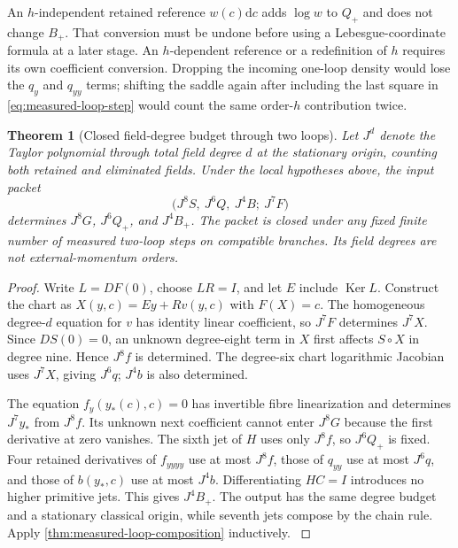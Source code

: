\documentclass[11pt,oneside,openany]{book}
\newtheorem{theorem}{Theorem}[chapter]
\theoremstyle{definition}
\theoremstyle{remark}
\newcommand{\dd}{\mathrm d}
\newcommand{\Ker}{\operatorname{Ker}}
\newcommand{\src}[2]{\cite[#2]{#1}}
\begin{document}
An $h$-independent retained reference $w(c)\dd c$ adds $\log w$ to
$Q_+$ and does not change $B_+$. That conversion must be undone before
using a Lebesgue-coordinate formula at a later stage. An $h$-dependent
reference or a redefinition of $h$ requires its own coefficient
conversion. Dropping the incoming one-loop density would lose the
$q_y$ and $q_{yy}$ terms; shifting the saddle again after including
the last square in \cref{eq:measured-loop-step} would count the same
order-$h$ contribution twice.

\begin{theorem}[Closed field-degree budget through two loops]
\label{thm:closed-loop-jet-packet}
Let $J^d$ denote the Taylor polynomial through total field degree $d$
at the stationary origin, counting both retained and eliminated
fields. Under the local hypotheses above, the input packet
\begin{equation}
 \bigl(J^8S,\ J^6Q,\ J^4B;\ J^7F\bigr)
 \label{eq:closed-loop-jet-packet}
\end{equation}
determines $J^8G$, $J^6Q_+$, and $J^4B_+$. The packet is closed
under any fixed finite number of measured two-loop steps on compatible
branches. Its field degrees are not external-momentum orders.
\end{theorem}
\begin{proof}
Write $L=DF(0)$, choose $LR=I$, and let $E$ include $\Ker L$.
Construct the chart as $X(y,c)=Ey+Rv(y,c)$ with $F(X)=c$. The
homogeneous degree-$d$ equation for $v$ has identity linear
coefficient, so $J^7F$ determines $J^7X$. Since $DS(0)=0$, an
unknown degree-eight term in $X$ first affects $S\circ X$ in degree
nine. Hence $J^8f$ is determined. The degree-six chart logarithmic
Jacobian uses $J^7X$, giving $J^6q$; $J^4b$ is also determined.

The equation $f_y(y_*(c),c)=0$ has invertible fibre linearization and
determines $J^7y_*$ from $J^8f$. Its unknown next coefficient cannot
enter $J^8G$ because the first derivative at zero vanishes. The
sixth jet of $H$ uses only $J^8f$, so $J^6Q_+$ is fixed. Four
retained derivatives of $f_{yyyy}$ use at most $J^8f$, those of
$q_{yy}$ use at most $J^6q$, and those of $b(y_*,c)$ use at most
$J^4b$. Differentiating $HC=I$ introduces no higher primitive jets.
This gives $J^4B_+$. The output has the same degree budget and a
stationary classical origin, while seventh jets compose by the chain
rule. Apply \cref{thm:measured-loop-composition} inductively.
\src{SM}{V8}
\end{proof}
\end{document}
